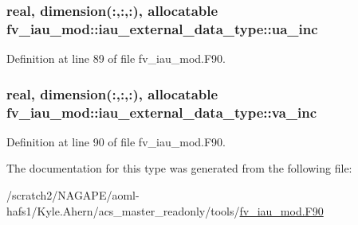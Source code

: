 \subsubsection[{ua\-\_\-inc}]{\setlength{\rightskip}{0pt plus 5cm}real, dimension(\-:,\-:,\-:), allocatable fv\-\_\-iau\-\_\-mod\-::iau\-\_\-external\-\_\-data\-\_\-type\-::ua\-\_\-inc\hspace{0.3cm}{\ttfamily [private]}}\label{structfv__iau__mod_1_1iau__external__data__type_aa2120844d59c8df335cdca70569a5ff8}


Definition at line 89 of file fv\-\_\-iau\-\_\-mod.\-F90.

\subsubsection[{va\-\_\-inc}]{\setlength{\rightskip}{0pt plus 5cm}real, dimension(\-:,\-:,\-:), allocatable fv\-\_\-iau\-\_\-mod\-::iau\-\_\-external\-\_\-data\-\_\-type\-::va\-\_\-inc\hspace{0.3cm}{\ttfamily [private]}}\label{structfv__iau__mod_1_1iau__external__data__type_a761119157387b5d60cccfc17d7dac1a6}


Definition at line 90 of file fv\-\_\-iau\-\_\-mod.\-F90.



The documentation for this type was generated from the following file\-:\begin{DoxyCompactItemize}
\item 
/scratch2/\-N\-A\-G\-A\-P\-E/aoml-\/hafs1/\-Kyle.\-Ahern/acs\-\_\-master\-\_\-readonly/tools/\hyperlink{fv__iau__mod_8F90}{fv\-\_\-iau\-\_\-mod.\-F90}\end{DoxyCompactItemize}
